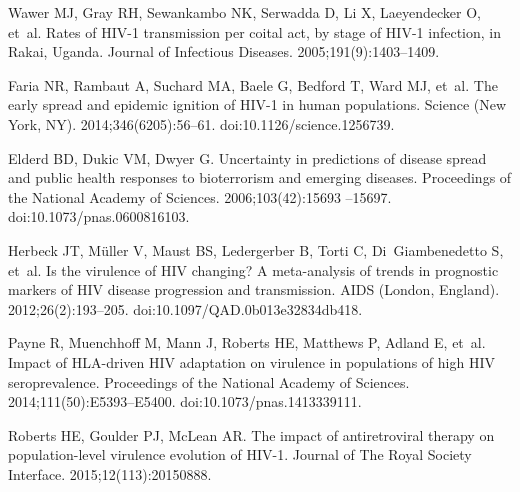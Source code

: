\documentclass[10pt,letterpaper]{article}
\begin{document}
\begin{thebibliography}{10}
Wawer MJ, Gray RH, Sewankambo NK, Serwadda D, Li X, Laeyendecker O, et~al.
\newblock Rates of {HIV}-1 transmission per coital act, by stage of {HIV}-1
  infection, in {Rakai}, {Uganda}.
\newblock Journal of Infectious Diseases. 2005;191(9):1403--1409.

Faria NR, Rambaut A, Suchard MA, Baele G, Bedford T, Ward MJ, et~al.
\newblock The early spread and epidemic ignition of {HIV}-1 in human
  populations.
\newblock Science (New York, NY). 2014;346(6205):56--61.
\newblock doi:{10.1126/science.1256739}.

Elderd BD, Dukic VM, Dwyer G.
\newblock Uncertainty in predictions of disease spread and public health
  responses to bioterrorism and emerging diseases.
\newblock Proceedings of the National Academy of Sciences. 2006;103(42):15693
  --15697.
\newblock doi:{10.1073/pnas.0600816103}.

Herbeck JT, Müller V, Maust BS, Ledergerber B, Torti C, Di~Giambenedetto S,
  et~al.
\newblock Is the virulence of {HIV} changing? {A} meta-analysis of trends in
  prognostic markers of {HIV} disease progression and transmission.
\newblock AIDS (London, England). 2012;26(2):193--205.
\newblock doi:{10.1097/QAD.0b013e32834db418}.

Payne R, Muenchhoff M, Mann J, Roberts HE, Matthews P, Adland E, et~al.
\newblock Impact of {HLA}-driven {HIV} adaptation on virulence in populations
  of high {HIV} seroprevalence.
\newblock Proceedings of the National Academy of Sciences.
  2014;111(50):E5393--E5400.
\newblock doi:{10.1073/pnas.1413339111}.

Roberts HE, Goulder PJ, McLean AR.
\newblock The impact of antiretroviral therapy on population-level virulence
  evolution of {HIV}-1.
\newblock Journal of The Royal Society Interface. 2015;12(113):20150888.

\end{thebibliography}

%
%
% 
\end{document}
